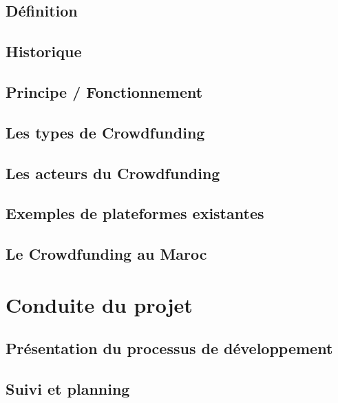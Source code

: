 \subsection*{Définition}
\subsection*{Historique}
\subsection*{Principe / Fonctionnement}
\subsection*{Les types de Crowdfunding}
\subsection*{Les acteurs du Crowdfunding}
\subsection*{Exemples de plateformes existantes}
\subsection*{Le Crowdfunding au Maroc}


\section*{Conduite du projet}
\subsection*{Présentation du processus de développement}
\subsection*{Suivi et planning}